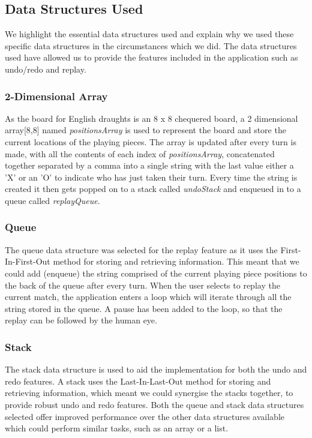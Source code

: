 \documentclass[10pt, a4paper]{article}
\begin{document}
    
     
    
    \subsection{Data Structures Used}
    We highlight the essential data structures used and explain why we used these specific data structures in the circumstances which we did. The data structures used have allowed us to provide the features included in the application such as undo/redo and replay.     
     
    
   		\subsubsection{2-Dimensional Array}   
   		As the board for English draughts is an 8 x 8 chequered board, a 2 dimensional array[8,8] named \textit{positionsArray} is used to represent the board and store the current locations of the playing pieces. The array is updated after every turn is made, with all the contents of each index of \textit{positionsArray}, concatenated together separated by a comma into a single string with the last value either a 'X' or an 'O' to indicate who has just taken their turn. Every time the string is created it then gets popped on to a stack called \textit{undoStack} and enqueued in to a queue called \textit{replayQueue}.
   
    
    
  		\subsubsection{Queue}
  		The queue data structure was selected for the replay feature as it uses the First-In-First-Out method for storing and retrieving information. This meant that we could add (enqueue) the string comprised of the current playing piece positions to the back of the queue after every turn. When the user selects to replay the current match, the application enters a loop which will iterate through all the string stored in the queue. A pause has been added to the loop, so that the replay can be followed by the human eye.
   
      
  		\subsubsection{Stack}
		The stack data structure is used to aid the implementation for both the undo and redo features. A stack uses the Last-In-Last-Out method for storing and retrieving information, which meant we could synergise the stacks together, to provide robust undo and redo features.
  		\newline
  		Both the queue and stack data structures selected offer improved performance over the other data structures available which could perform similar tasks, such as an array or a list.
  
\end{document}
